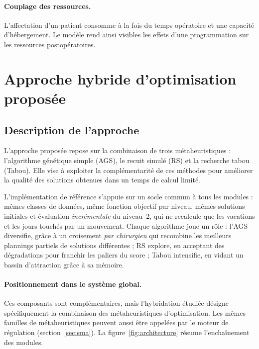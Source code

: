 \documentclass[11pt,a4paper]{article}
\begin{document}
\paragraph{Couplage des ressources.}
L'affectation d'un patient consomme à la fois du temps opératoire et une capacité d'hébergement. Le modèle rend ainsi visibles les effets d'une programmation sur les ressources postopératoires.


\section{Approche hybride d'optimisation proposée}
\label{sec:method}


\subsection{Description de l'approche}

L'approche proposée repose sur la combinaison de trois
métaheuristiques : l'algorithme génétique simple (AGS),
le recuit simulé (RS) et la recherche tabou (Tabou). Elle vise
à exploiter la complémentarité de ces méthodes pour
améliorer la qualité des solutions obtenues dans un
temps de calcul limité.

L'implémentation de référence s'appuie sur un socle commun à tous les modules : mêmes classes de données, même fonction objectif par niveau, mêmes solutions initiales et évaluation \emph{incrémentale} du niveau~2, qui ne recalcule que les vacations et les jours touchés par un mouvement. Chaque algorithme joue un rôle : l'AGS diversifie, grâce à un croisement \emph{par chirurgien} qui recombine les meilleurs plannings partiels de solutions différentes ; RS explore, en acceptant des dégradations pour franchir les paliers du score ; Tabou intensifie, en vidant un bassin d'attraction grâce à sa mémoire.

\paragraph{Positionnement dans le système global.}

Ces composants sont complémentaires, mais
l'hybridation étudiée désigne spécifiquement
la combinaison des métaheuristiques d'optimisation.
Les mêmes familles de métaheuristiques peuvent aussi être appelées par le moteur de régulation (section~\ref{sec:sma}). La figure~\ref{fig:architecture} résume l'enchaînement des modules.
\end{document}
